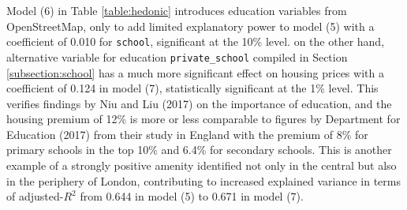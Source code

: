 \documentclass{article}
\begin{document}
Model (6) in  Table \ref{table:hedonic} introduces education variables from OpenStreetMap, only to add limited explanatory power to model (5) with a coefficient of 0.010 for \texttt{school}, significant at the 10\% level. on the other hand, alternative variable for education \texttt{private\_school} compiled in Section \ref{subsection:school} has a much more significant effect on housing prices with a coefficient of 0.124 in model (7), statistically significant at the 1\% level. This verifies findings by Niu and Liu (2017) on the importance of education, and the housing premium of 12\% is more or less comparable to figures by Department for Education (2017) from their study in England with the premium of 8\% for primary schools in the top 10\% and 6.4\% for secondary schools.  This is another example of a strongly positive amenity identified not only in the central but also in the periphery of London, contributing to increased explained variance in terms of adjusted-$R^2$ from 0.644 in model (5) to 0.671 in model (7). \\\\
\end{document}
